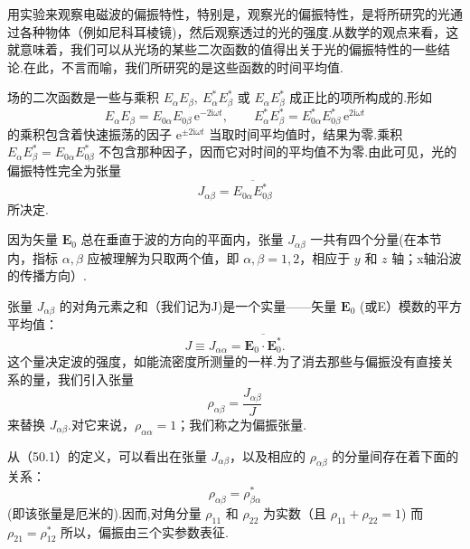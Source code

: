 用实验来观察电磁波的偏振特性，特别是，观察光的偏振特性，是将所研究的光通过各种物体（例如尼科耳棱镜)，然后观察透过的光的强度.从数学的观点来看，这就意味着，我们可以从光场的某些二次函数的值得出关于光的偏振特性的一些结论.在此，不言而喻，我们所研究的是这些函数的时间平均值.

场的二次函数是一些与乘积 $E_\alpha E_\beta,\ E_\alpha^*E_\beta^*$ 或 $E_\alpha E_\beta^*$ 成正比的项所构成的.形如
\begin{equation*}
  E_\alpha E_\beta=E_{0\alpha}E_{0\beta}\,\mathrm{e}^{-2\mathrm{i}\omega t},\qquad
  E_\alpha^*E_\beta^*=E_{0\alpha}^*E_{0\beta}^*\,\mathrm{e}^{2\mathrm{i}\omega t}
\end{equation*}
的乘积包含着快速振荡的因子 $\mathrm{e}^{\pm 2\mathrm{i}\omega t}$ 当取时间平均值时，结果为零.乘积 $E_\alpha E_\beta^* = E_{0\alpha}E_{0\beta}^*$ 不包含那种因子，因而它对时间的平均值不为零.由此可见，光的偏振特性完全为张量
\begin{equation}
  J_{\alpha\beta}=\overline{E_{0\alpha}E_{0\beta}^*}
\end{equation}
所决定.

因为矢量 $\boldsymbol{E}_0$ 总在垂直于波的方向的平面内，张量 $J_{\alpha\beta}$ 一共有四个分量(在本节内，指标 $\alpha,\beta$ 应被理解为只取两个值，即 $\alpha,\beta = 1,2$，相应于 $y$ 和 $z$ 轴；x轴沿波的传播方向）.

张量 $J_{\alpha\beta}$ 的对角元素之和（我们记为J)是一个实量——矢量 $\boldsymbol{E}_0$ (或E）模数的平方平均值：
\begin{equation}
  J\equiv J_{\alpha\alpha}=\overline{\boldsymbol{E}_0\cdot\boldsymbol{E}_0^*}.
\end{equation}
这个量决定波的强度，如能流密度所测量的一样.为了消去那些与偏振没有直接关系的量，我们引入张量
\begin{equation}
  \rho_{\alpha\beta}=\frac{J_{\alpha\beta}}{J}
\end{equation}
来替换 $J_{\alpha\beta}$.对它来说，$\rho_{\alpha\alpha} = 1$；我们称之为偏振张量.

从（50.1）的定义，可以看出在张量 $J_{\alpha\beta}$，以及相应的 $\rho_{\alpha\beta}$ 的分量间存在着下面的关系：
\begin{equation}
  \rho_{\alpha\beta}=\rho_{\beta\alpha}^*
\end{equation}
(即该张量是厄米的).因而,对角分量 $\rho_{11}$ 和 $\rho_{22}$ 为实数（且 $\rho_{11}+\rho_{22} = 1$) 而 $\rho_{21} = \rho_{12}^*$ 所以，偏振由三个实参数表征.

